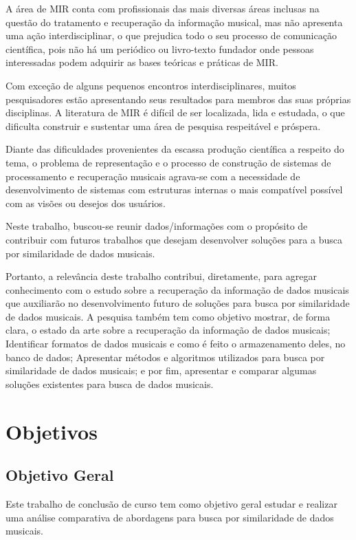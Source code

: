 A área de MIR conta com profissionais das mais diversas áreas inclusas na questão do tratamento e recuperação da informação musical, mas não apresenta uma ação interdisciplinar, o que prejudica todo o seu processo de comunicação científica, pois não há um periódico ou livro-texto fundador onde pessoas interessadas podem adquirir as bases teóricas e práticas de MIR. 

Com exceção de alguns pequenos encontros interdisciplinares, muitos pesquisadores estão apresentando seus resultados para membros das suas próprias disciplinas. A literatura de MIR é difícil de ser localizada, lida e estudada, o que dificulta construir e sustentar uma área de pesquisa respeitável e próspera.

Diante das dificuldades provenientes da escassa produção científica a respeito do tema, o problema de representação e o processo de construção de sistemas de processamento e recuperação musicais agrava-se com a necessidade de desenvolvimento de sistemas com estruturas internas o mais compatível possível com as visões ou desejos dos usuários.

Neste trabalho, buscou-se reunir dados/informações com o propósito de contribuir com futuros trabalhos que desejam desenvolver soluções para a busca por similaridade de dados musicais.

Portanto, a relevância deste trabalho contribui, diretamente, para agregar conhecimento com o estudo sobre a recuperação da informação de dados musicais que auxiliarão no desenvolvimento futuro de soluções para busca por similaridade de dados musicais. A pesquisa também tem como objetivo mostrar, de forma clara, o estado da arte sobre a recuperação da informação de dados musicais; Identificar formatos de dados musicais e como é feito o armazenamento deles, no banco de dados; Apresentar métodos e algoritmos utilizados para busca por similaridade de dados musicais; e por fim, apresentar e comparar algumas soluções existentes para busca de dados musicais.

\section{Objetivos}
\subsection{Objetivo Geral}
Este trabalho de conclusão de curso tem como objetivo geral estudar e realizar uma análise comparativa de abordagens para busca por similaridade de dados musicais.

